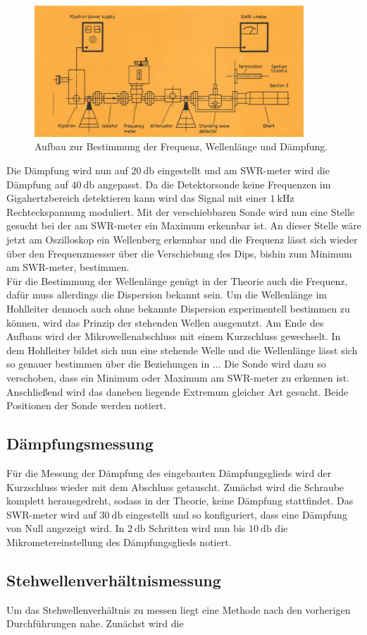 \begin{figure}
    \centering
    \includegraphics[width=0.9\textwidth]{bilder/aufbau2.png}
    \caption{Aufbau zur Bestimmung der Frequenz, Wellenlänge und Dämpfung. \cite{skript}} 
    \label{fig:2}
\end{figure}
Die Dämpfung wird nun auf $\SI{20}{\decibel}$ eingestellt und am SWR-meter wird die Dämpfung auf $\SI{40}{\decibel}$ angepasst. Da die Detektorsonde keine Frequenzen im Gigahertzbereich detektieren kann wird das Signal mit einer $\SI{1}{\kilo\hertz}$ Rechteckspannung
moduliert. Mit der verschiebbaren Sonde wird nun eine Stelle gesucht bei der am SWR-meter ein Maximum erkennbar ist. An dieser Stelle wäre jetzt am Oszilloskop ein Wellenberg erkennbar und die Frequenz lässt sich wieder über den Frequenzmesser
über die Verschiebung des Dips, bishin zum Minimum am SWR-meter, bestimmen.
\\
\newline
Für die Bestimmung der Wellenlänge genügt in der Theorie auch die Frequenz, dafür muss allerdings die Dispersion bekannt sein. Um die Wellenlänge im Hohlleiter dennoch auch ohne bekannte Dispersion
experimentell bestimmen zu können, wird das Prinzip der stehenden Wellen ausgenutzt. Am Ende des Aufbaus wird der Mikrowellenabschluss mit einem Kurzschluss gewechselt. In dem Hohlleiter bildet sich nun eine stehende Welle
und die Wellenlänge lässt sich so genauer bestimmen über die Beziehungen in ...
Die Sonde wird dazu so verschoben, dass ein Minimum oder Maximum am SWR-meter zu erkennen ist. Anschließend wird das daneben liegende Extremum gleicher Art gesucht. Beide Positionen der Sonde werden notiert.

\subsection{Dämpfungsmessung}
Für die Messung der Dämpfung des eingebauten Dämpfungsglieds wird der Kurzschluss wieder mit dem Abschluss getauscht. Zunächst wird die Schraube komplett herausgedreht, sodass in der Theorie, keine Dämpfung stattfindet. Das SWR-meter wird auf 
$\SI{30}{\decibel}$ eingestellt und
so konfiguriert, dass eine Dämpfung von Null angezeigt wird. In $\SI{2}{\decibel}$ Schritten wird nun bis $\SI{10}{\decibel}$ die Mikrometereinstellung des Dämpfungsglieds notiert.

\subsection{Stehwellenverhältnismessung}
Um das Stehwellenverhältnis zu messen liegt eine Methode nach den vorherigen Durchführungen nahe. Zunächst wird die 
